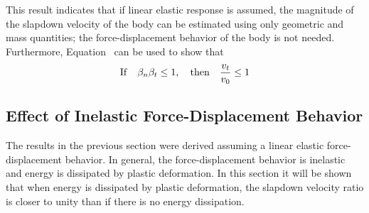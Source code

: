 This result indicates that if linear elastic response is assumed, the
magnitude of the slapdown velocity of the body can be estimated using
only geometric and mass quantities; the force-displacement behavior of
the body is not needed.  Furthermore, Equation~ can be
used to show that
\begin{equation}
{\rm If} \quad\beta_n\beta_t \leq1, \quad{\rm then}
\quad\frac{v_t}{v_0} \leq1\label{eq:blbr}
\end{equation}

\subsection{Effect of Inelastic Force-Displacement Behavior}

The results in the previous section were derived assuming a linear
elastic force-displacement behavior.  In general, the force-displacement
behavior is inelastic and energy is dissipated by plastic deformation.
In this section it will be shown that when energy is dissipated by
plastic deformation, the slapdown velocity ratio is closer to
unity than if there is no energy dissipation.


